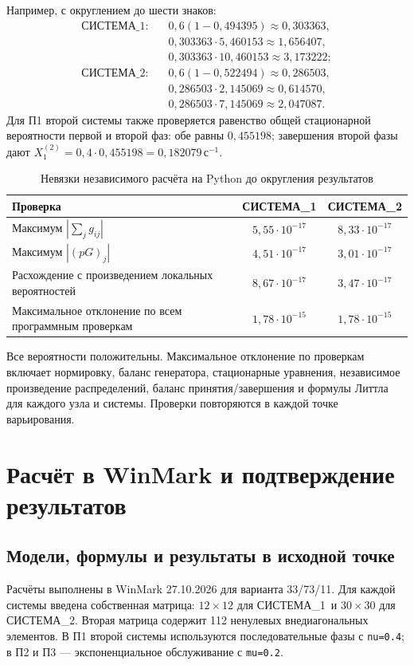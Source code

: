 \documentclass[a4paper,12pt]{article}
\newcommand{\sysone}{СИСТЕМА\_1}
\newcommand{\systwo}{СИСТЕМА\_2}
\newcommand{\secunit}{\,\text{с}^{-1}}
\begin{document}
Например, с округлением до шести знаков:
\[
\begin{aligned}
\text{\sysone}:\quad &0{,}6(1-0{,}494395)\approx0{,}303363,\\
&0{,}303363\cdot5{,}460153\approx1{,}656407,\\
&0{,}303363\cdot10{,}460153\approx3{,}173222;\\[2pt]
\text{\systwo}:\quad &0{,}6(1-0{,}522494)\approx0{,}286503,\\
&0{,}286503\cdot2{,}145069\approx0{,}614570,\\
&0{,}286503\cdot7{,}145069\approx2{,}047087.
\end{aligned}
\]
Для П1 второй системы также проверяется равенство общей стационарной вероятности первой и второй фаз: обе равны $0{,}455198$; завершения второй фазы дают $X_1^{(2)}=0{,}4\cdot0{,}455198=0{,}182079\secunit$.

\begin{table}[H]\centering\small
\caption{Невязки независимого расчёта на Python до округления результатов}
\begin{tabular}{@{}p{8.8cm}cc@{}}\toprule
Проверка & \sysone & \systwo\\\midrule
Максимум $|\sum_jg_{ij}|$ & $5{,}55\cdot10^{-17}$ & $8{,}33\cdot10^{-17}$\\
Максимум $|(pG)_j|$ & $4{,}51\cdot10^{-17}$ & $3{,}01\cdot10^{-17}$\\
Расхождение с произведением локальных вероятностей & $8{,}67\cdot10^{-17}$ & $3{,}47\cdot10^{-17}$\\
Максимальное отклонение по всем программным проверкам & $1{,}78\cdot10^{-15}$ & $1{,}78\cdot10^{-15}$\\\bottomrule
\end{tabular}
\end{table}
Все вероятности положительны. Максимальное отклонение по проверкам включает нормировку, баланс генератора, стационарные уравнения, независимое произведение распределений, баланс принятия/завершения и формулы Литтла для каждого узла и системы. Проверки повторяются в каждой точке варьирования.


\clearpage
\section{Расчёт в WinMark и подтверждение результатов}\label{sec:winmark}
\subsection{Модели, формулы и результаты в исходной точке}
Расчёты выполнены в WinMark 27.10.2026 для варианта 33/73/11. Для каждой системы введена собственная матрица: $12\times12$ для \sysone\ и $30\times30$ для \systwo. Вторая матрица содержит 112 ненулевых внедиагональных элементов. В П1 второй системы используются последовательные фазы с \texttt{nu=0.4}; в П2 и П3 --- экспоненциальное обслуживание с \texttt{mu=0.2}.
\end{document}
